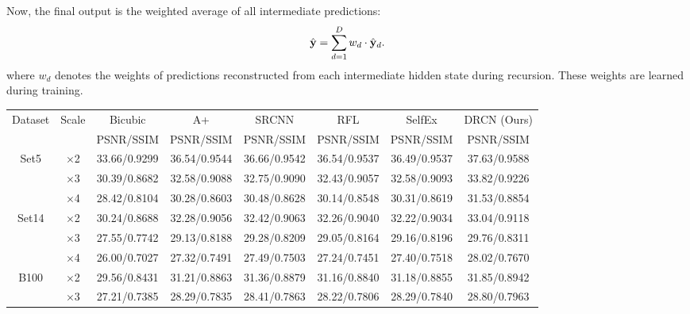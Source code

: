 \documentclass[10pt,twocolumn,letterpaper]{article}
\begin{document}
Now, the final output is the weighted average of all intermediate predictions:
\begin{equation}
\hat{{\bf y}} = \sum_{d=1}^{D} w_d \cdot \hat{{\bf y}}_d.
\end{equation}
where $w_d$ denotes the weights of predictions reconstructed from each intermediate hidden state during recursion. These weights are learned during training.


\begin{table}
\begin{center}
\setlength{\tabcolsep}{2pt}
\small
\begin{tabular}{ | c | c | c | c | c | c | c | c | }
\hline
\multirow{2}{*}{Dataset} & \multirow{2}{*}{Scale} & Bicubic & A+ \cite{Timofte} & SRCNN \cite{dong2014image} & RFL \cite{schulter2015fast} & SelfEx \cite{Huang-CVPR-2015} & DRCN (Ours)\\
 & & PSNR/SSIM & PSNR/SSIM & PSNR/SSIM & PSNR/SSIM & PSNR/SSIM & PSNR/SSIM\\
\hline
\hline
\multirow{3}{*}{Set5} & $\times$2 & 33.66/0.9299 & 36.54/{\color{blue}0.9544} & {\color{blue}36.66}/0.9542 & 36.54/0.9537 & 36.49/0.9537 & {\color{red}37.63}/{\color{red}0.9588}\\
 & $\times$3 & 30.39/0.8682 & 32.58/0.9088 & {\color{blue}32.75}/0.9090 & 32.43/0.9057 & 32.58/{\color{blue}0.9093} & {\color{red}33.82}/{\color{red}0.9226}\\
 & $\times$4 & 28.42/0.8104 & 30.28/0.8603 & {\color{blue}30.48}/{\color{blue}0.8628} & 30.14/0.8548 & 30.31/0.8619 & {\color{red}31.53}/{\color{red}0.8854}\\
\hline
\hline
\multirow{3}{*}{Set14} & $\times$2 & 30.24/0.8688 & 32.28/0.9056 & {\color{blue}32.42}/{\color{blue}0.9063} & 32.26/0.9040 & 32.22/0.9034 & {\color{red}33.04}/{\color{red}0.9118}\\
 & $\times$3 & 27.55/0.7742 & 29.13/0.8188 & {\color{blue}29.28}/{\color{blue}0.8209} & 29.05/0.8164 & 29.16/0.8196 & {\color{red}29.76}/{\color{red}0.8311}\\
 & $\times$4 & 26.00/0.7027 & 27.32/0.7491 & {\color{blue}27.49}/0.7503 & 27.24/0.7451 & 27.40/{\color{blue}0.7518} & {\color{red}28.02}/{\color{red}0.7670}\\
\hline
\hline
\multirow{3}{*}{B100} & $\times$2 & 29.56/0.8431 & 31.21/0.8863 & {\color{blue}31.36}/{\color{blue}0.8879} & 31.16/0.8840 & 31.18/0.8855 & {\color{red}31.85}/{\color{red}0.8942}\\
 & $\times$3 & 27.21/0.7385 & 28.29/0.7835 & {\color{blue}28.41}/{\color{blue}0.7863} & 28.22/0.7806 & 28.29/0.7840 & {\color{red}28.80}/{\color{red}0.7963}\\

\end{tabular}
\end{center}
\end{table}
\end{document}
